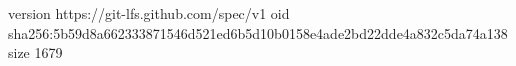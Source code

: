 version https://git-lfs.github.com/spec/v1
oid sha256:5b59d8a662333871546d521ed6b5d10b0158e4ade2bd22dde4a832c5da74a138
size 1679
